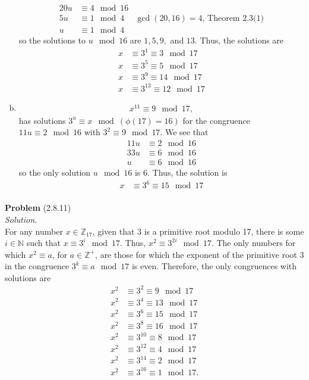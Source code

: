\documentclass[12 pt]{amsart}
\begin{document}
\begin{enumerate}[a.]
\begin{align*}
        20 u &\equiv 4 \mod 16 \\
        5 u  & \equiv 1 \mod 4 & \text{$\gcd(20,16) = 4$, Theorem 2.3(1)} \\
        u  & \equiv 1 \mod 4
      \end{align*}
      so the solutions to $u \mod 16$ are $1, 5, 9,$ and $13$. 
      Thus, the solutions are 
      \begin{align*}
        x &\equiv 3^{1} \equiv 3 \mod 17 \\
        x &\equiv 3^{5} \equiv 5 \mod 17 \\
        x &\equiv 3^{9} \equiv 14 \mod 17 \\
        x &\equiv 3^{13} \equiv 12 \mod 17 
      \end{align*}
    \item
      \begin{align*}
        x^{11} \equiv 9 \mod 17,      
      \end{align*}
      has solutions $3^u \equiv x \mod (\phi(17) = 16)$ for  the congruence
      $11 u \equiv 2 \mod 16$ with $3^2 \equiv 9 \mod 17$. 
      We see that 
      \begin{align*}
        11 u &\equiv 2 \mod 16 \\
        33 u  & \equiv 6 \mod 16 \\
        u  & \equiv 6 \mod 16
      \end{align*}
      so the only solution $u \mod 16$ is $6$. 
      Thus, the solution is 
      \begin{align*}
        x &\equiv 3^{6} \equiv 15 \mod 17 \\
      \end{align*}
  \end{enumerate}
\vfill
\newpage



\phantom{\quad} \vfill
\noindent
\textbf{Problem} (2.8.11) \\[4ex]
\emph{Solution.} \\[2ex]
  For any number $x \in \mathbb{Z}_{17}$,  
  given that 3 is a primitive root modulo 17,
  there is some $i \in \mathbb{N}$ such that
  $x \equiv 3^i \mod 17$. 
  Thus, $x^2 \equiv 3^{2i} \mod 17$.
  The only numbers for which 
  $x^2 \equiv a$, for $a \in \mathbb{Z}^+$, 
  are those for which the exponent of the primitive root 3
  in the congruence $3^k \equiv a \mod 17$ is even.
  Therefore, the only congruences with solutions are 
  \begin{align*}
    x^2 &\equiv 3^2 \equiv 9 \mod 17 \\
    x^2 &\equiv 3^4 \equiv 13 \mod 17 \\
    x^2 &\equiv 3^6 \equiv 15 \mod 17 \\
    x^2 &\equiv 3^8 \equiv 16 \mod 17 \\
    x^2 &\equiv 3^{10} \equiv 8 \mod 17 \\
    x^2 &\equiv 3^{12} \equiv 4 \mod 17 \\
    x^2 &\equiv 3^{14} \equiv 2 \mod 17 \\
    x^2 &\equiv 3^{16} \equiv 1 \mod 17.
  \end{align*}
\vfill
\newpage
\end{document}
